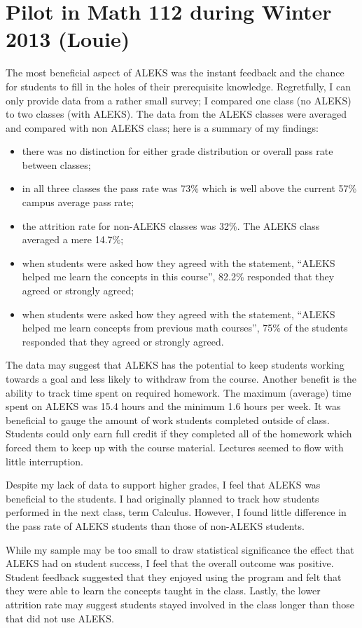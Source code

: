 \section{Pilot in Math 112 during Winter 2013 (Louie)}
The most beneficial aspect of ALEKS was the instant feedback and the chance for students to fill in the holes of their prerequisite knowledge. Regretfully, I can only provide data from a rather small survey; I compared one class (no ALEKS) to two classes (with ALEKS). The data from the ALEKS classes were averaged and compared with non ALEKS class; here is a summary of my findings:
\begin{itemize}
	\item there was no distinction for either grade distribution or overall pass rate between classes;
	\item in all three classes the pass rate was 73\% which is well above the current 57\% campus average pass rate;
	\item the attrition rate for non-ALEKS classes was 32\%. The ALEKS class averaged a mere 14.7\%;
\item 	when students were asked how they agreed with the statement, ``ALEKS helped me learn the concepts in this course'',  82.2\% responded that they agreed or strongly agreed;
\item	when students were asked how they agreed with the statement, ``ALEKS helped me learn concepts from previous math courses'', 75\% of the students responded that they agreed or strongly agreed.
\end{itemize}
The data may suggest that ALEKS has the potential to keep students working towards a goal and less likely to withdraw from the course. Another benefit is the ability to track time spent on required homework. The maximum (average) time spent on ALEKS was 15.4 hours and the minimum 1.6 hours per week. It was beneficial to gauge the amount of work students completed outside of class. Students could only earn full credit if they completed all of the homework which forced them to keep up with the course material. Lectures seemed to flow with little interruption. 

Despite my lack of data to support higher grades, I feel that ALEKS was beneficial to the students. I had originally planned to track how students performed in the next class,  term Calculus. However, I found little difference in the pass rate of ALEKS students than those of non-ALEKS students. 

While my sample may be too small to draw statistical significance the effect that ALEKS had on student success, I feel that the overall outcome was positive. Student feedback suggested that they enjoyed using the program and felt that they were able to learn the concepts taught in the class. Lastly, the lower attrition rate may suggest students stayed involved in the class longer than those that did not use ALEKS. 